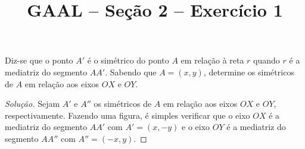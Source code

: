 \documentclass[a4paper,11pt]{article}
\title{GAAL -- Seção 2 -- Exercício 1}
\author{\empty}
\date{\empty}
\newcommand\onlyinsubfileone\maketitle
\begin{document}
\onlyinsubfileone

\begin{exercicio-gaal}[E1.S2]
  Diz-se que o ponto $A'$ é o simétrico do ponto $A$ em relação à reta $r$ quando $r$ é a mediatriz do segmento $AA'$.
  Sabendo que $A = (x,y)$, determine os simétricos de $A$ em relação aos eixos $OX$ e $OY$.
\end{exercicio-gaal}

\begin{proof}[Solução]
  Sejam $A'$ e $A''$ os simétricos de $A$ em relação aos eixos $OX$ e $OY$, respectivamente.
  Fazendo uma figura, é simples verificar que o eixo $OX$ é a mediatriz do segmento $AA'$ com $A' = (x,-y)$ e o eixo $OY$ é a mediatriz do segmento $AA''$ com $A''=(-x,y)$.
\end{proof}
\end{document}
